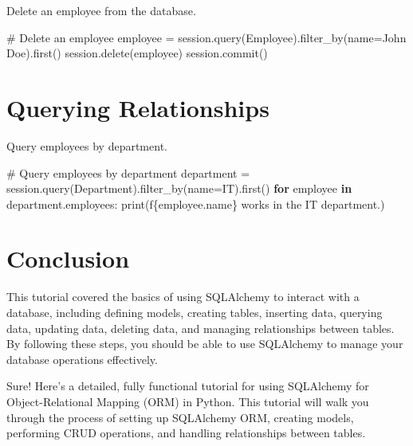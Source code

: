 \documentclass[
  letterpaper,
  DIV=11,
  numbers=noendperiod]{scrreprt}
\newenvironment{Shaded}{\begin{snugshade}}{\end{snugshade}}
\newcommand{\BuiltInTok}[1]{\textcolor[rgb]{0.00,0.23,0.31}{#1}}
\newcommand{\CommentTok}[1]{\textcolor[rgb]{0.37,0.37,0.37}{#1}}
\newcommand{\ControlFlowTok}[1]{\textcolor[rgb]{0.00,0.23,0.31}{\textbf{#1}}}
\newcommand{\KeywordTok}[1]{\textcolor[rgb]{0.00,0.23,0.31}{\textbf{#1}}}
\newcommand{\NormalTok}[1]{\textcolor[rgb]{0.00,0.23,0.31}{#1}}
\newcommand{\OperatorTok}[1]{\textcolor[rgb]{0.37,0.37,0.37}{#1}}
\newcommand{\SpecialCharTok}[1]{\textcolor[rgb]{0.37,0.37,0.37}{#1}}
\newcommand{\SpecialStringTok}[1]{\textcolor[rgb]{0.13,0.47,0.30}{#1}}
\newcommand{\StringTok}[1]{\textcolor[rgb]{0.13,0.47,0.30}{#1}}
\begin{document}
Delete an employee from the database.

\begin{Shaded}
\begin{Highlighting}[]
\CommentTok{\# Delete an employee}
\NormalTok{employee }\OperatorTok{=}\NormalTok{ session.query(Employee).filter\_by(name}\OperatorTok{=}\StringTok{\textquotesingle{}John Doe\textquotesingle{}}\NormalTok{).first()}
\NormalTok{session.delete(employee)}
\NormalTok{session.commit()}
\end{Highlighting}
\end{Shaded}

\section{Querying Relationships}\label{querying-relationships}

Query employees by department.

\begin{Shaded}
\begin{Highlighting}[]
\CommentTok{\# Query employees by department}
\NormalTok{department }\OperatorTok{=}\NormalTok{ session.query(Department).filter\_by(name}\OperatorTok{=}\StringTok{\textquotesingle{}IT\textquotesingle{}}\NormalTok{).first()}
\ControlFlowTok{for}\NormalTok{ employee }\KeywordTok{in}\NormalTok{ department.employees:}
    \BuiltInTok{print}\NormalTok{(}\SpecialStringTok{f\textquotesingle{}}\SpecialCharTok{\{}\NormalTok{employee}\SpecialCharTok{.}\NormalTok{name}\SpecialCharTok{\}}\SpecialStringTok{ works in the IT department.\textquotesingle{}}\NormalTok{)}
\end{Highlighting}
\end{Shaded}

\section{Conclusion}\label{conclusion-15}

This tutorial covered the basics of using SQLAlchemy to interact with a
database, including defining models, creating tables, inserting data,
querying data, updating data, deleting data, and managing relationships
between tables. By following these steps, you should be able to use
SQLAlchemy to manage your database operations effectively.

Sure! Here's a detailed, fully functional tutorial for using SQLAlchemy
for Object-Relational Mapping (ORM) in Python. This tutorial will walk
you through the process of setting up SQLAlchemy ORM, creating models,
performing CRUD operations, and handling relationships between tables.
\end{document}
